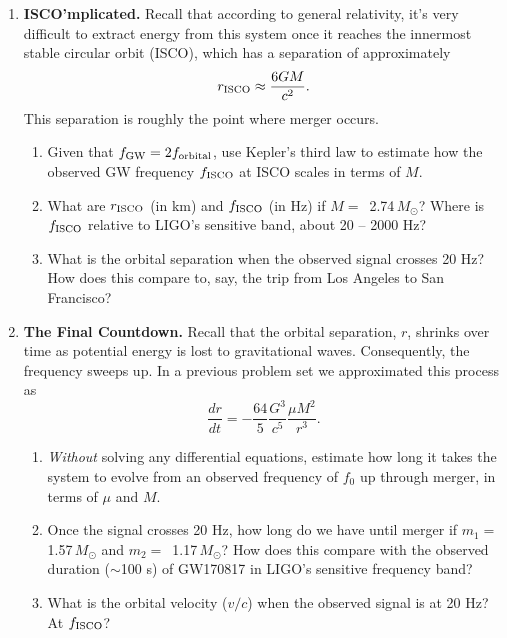 \documentclass[11pt]{article}
\begin{document}
\begin{enumerate}

\item \textbf{ISCO'mplicated.} Recall that according to general relativity, it's very difficult to extract energy from this system once it reaches
the innermost stable circular orbit (ISCO), which has a separation of approximately
\begin{equation}\label{eq:rISCO}
r_{\rm ISCO} \approx \frac{6GM}{c^2}.
\end{equation} This separation is roughly the point where merger occurs.\begin{enumerate}
\item Given that $f_{\rm GW} = 2f_{\rm orbital}$, use Kepler's third law to estimate how the observed GW frequency $f_{\rm ISCO}$ at ISCO scales in
terms of $M$.

\item What are $r_{\rm ISCO}$ (in km) and $f_{\rm ISCO}$ (in Hz) if $M =$\, 2.74\,$M_{\odot}$? Where is $f_{\rm ISCO}$ relative to LIGO's sensitive
band, about 20 -- 2000 Hz?

\item What is the orbital separation when the observed signal crosses 20 Hz? How does this compare to, say, the trip from Los Angeles to San
Francisco?
\end{enumerate}

\item \textbf{The Final Countdown.} Recall that the orbital separation, $r$, shrinks over time as potential energy is lost to gravitational waves.
Consequently, the frequency sweeps up. In a previous problem set we approximated this process as
\begin{equation}\label{eq:drdt}
\frac{dr}{dt} = - \frac{64}{5} \frac{G^3}{c^5} \frac{\mu M^2}{r^3}.
\end{equation}\begin{enumerate}
\item \emph{Without} solving any differential equations, estimate how long it takes the system to evolve from an observed frequency of $f_0$ up
through merger, in terms of $\mu$ and $M$.

\item Once the signal crosses 20 Hz, how long do we have until merger if $m_1 = $\, 1.57\,$M_{\odot}$ and $m_2 =$\, 1.17\,$M_{\odot}$? How does
this compare with the observed duration ($\sim$100 s) of GW170817 in LIGO's sensitive frequency band?

\item What is the orbital velocity ($v/c$) when the observed signal is at 20 Hz? At $f_{\rm ISCO}$?
\end{enumerate}


\end{enumerate}
\end{document}
